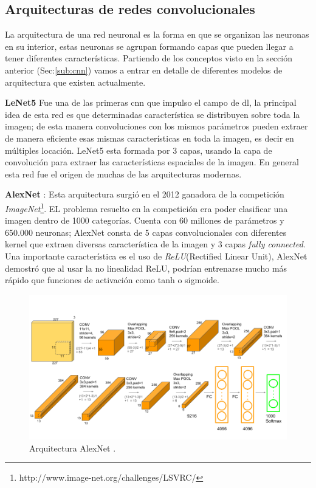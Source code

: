 \subsection{Arquitecturas de redes convolucionales}\label{sub:arquitecturacnn}
La arquitectura de una red neuronal es la forma en que se organizan  las neuronas en su interior, estas neuronas se agrupan formando capas que pueden llegar a tener diferentes características. Partiendo de los conceptos visto en la sección anterior (Sec:\ref{sub:cnn}) vamos a entrar en detalle de diferentes modelos de arquitectura que existen actualmente.

\par \textbf{LeNet5} \citep{lenet} Fue una de las primeras \ac{cnn} que impulso el campo de \ac{dl}, la principal idea de esta red es que determinadas característica se distribuyen sobre toda la imagen; de esta manera convoluciones con los mismos parámetros pueden extraer de manera eficiente esas mismas características en toda la imagen, es decir en múltiples locación. LeNet5 esta formada por 3 capas, usando la capa de convolución para extraer las características espaciales de la imagen. En general esta red fue el origen de muchas de las arquitecturas modernas.

\par \textbf{AlexNet} \citep{alexnet}: Esta arquitectura surgió en el 2012 ganadora de la competición \textit{ImageNet}\footnote{http://www.image-net.org/challenges/LSVRC/}. EL problema resuelto en la competición era poder clasificar una imagen dentro de 1000 categorías. Cuenta con 60 millones de parámetros y 650.000 neuronas; AlexNet consta de 5 capas convolucionales con diferentes kernel que extraen diversas característica de la imagen  y 3 capas \textit{fully connected}. Una importante característica es el uso de \textit{ReLU}(Rectified Linear Unit),  AlexNet demostró que al usar la no linealidad ReLU,  podrían entrenarse mucho más rápido que  funciones de activación como  tanh o sigmoide.

\begin{figure}[H]
 \centering
  \includegraphics[scale=0.4,keepaspectratio=true,clip=true]{imagenes/MarcoTeorico/AlexNet-1.png}
  \caption{Arquitectura AlexNet \citep{alexnet}.}
	\label{Fig:alexnet}
\end{figure}


